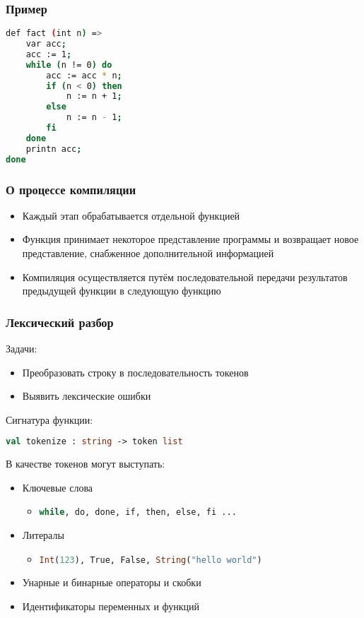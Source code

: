 \documentclass{beamer}
\begin{document}
	\begin{frame}[fragile]
		\frametitle{Пример}
	\begin{lstlisting}[language=BASH] 
def fact (int n) =>
	var acc;
	acc := 1;
	while (n != 0) do
		acc := acc * n;
		if (n < 0) then
			n := n + 1;
		else
			n := n - 1;
		fi
	done 
	printn acc;
done
	\end{lstlisting}
	\end{frame}

	\begin{frame}
		\frametitle{О процессе компиляции}
			\begin{itemize}
			\item Каждый этап обрабатывается отдельной функцией
			\item Функция принимает некоторое представление программы и возвращает новое представление, снабженное дополнительной информацией
			\item Компиляция осуществляется путём последовательной передачи результатов предыдущей функции в следующую функцию
			\end{itemize}
	\end{frame}

	\begin{frame}[fragile]
		\frametitle{Лексический разбор}
			Задачи:
			\begin{itemize}
				\item Преобразовать строку в последовательность токенов
				\item Выявить лексические ошибки
			\end{itemize}
			Сигнатура функции:

			\begin{lstlisting}[language=ML] 
	val tokenize : string -> token list
			\end{lstlisting}

			В качестве токенов могут выступать:
			\begin{itemize}
				\item Ключевые слова
				\begin{itemize}
					\item \lstinline[language=BASH]|while, do, done, if, then, else, fi ...|
				\end{itemize}
				\item Литералы
				\begin{itemize}
					\item \lstinline[language=ML]|Int(123), True, False, String("hello world")|
				\end{itemize}
				\item Унарные и бинарные операторы и скобки
				\item Идентификаторы переменных и функций
			\end{itemize}
	\end{frame}
	
\end{document}
